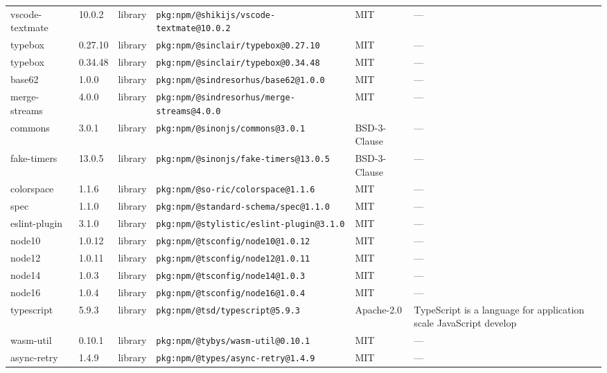 \documentclass[11pt,a4paper]{article}
\begin{document}
\begin{longtable}{|p{4cm}|p{2cm}|p{1.6cm}|p{5cm}|p{1.5cm}|p{3.5cm}|}
\raggedright vscode-textmate & 10.0.2 & library & \small\texttt{pkg:npm/@shikijs/vscode-textmate@10.0.2} & MIT & \small — \\
\raggedright typebox & 0.27.10 & library & \small\texttt{pkg:npm/@sinclair/typebox@0.27.10} & MIT & \small — \\
\raggedright typebox & 0.34.48 & library & \small\texttt{pkg:npm/@sinclair/typebox@0.34.48} & MIT & \small — \\
\raggedright base62 & 1.0.0 & library & \small\texttt{pkg:npm/@sindresorhus/base62@1.0.0} & MIT & \small — \\
\raggedright merge-streams & 4.0.0 & library & \small\texttt{pkg:npm/@sindresorhus/merge-streams@4.0.0} & MIT & \small — \\
\raggedright commons & 3.0.1 & library & \small\texttt{pkg:npm/@sinonjs/commons@3.0.1} & BSD-3-Clause & \small — \\
\raggedright fake-timers & 13.0.5 & library & \small\texttt{pkg:npm/@sinonjs/fake-timers@13.0.5} & BSD-3-Clause & \small — \\
\raggedright colorspace & 1.1.6 & library & \small\texttt{pkg:npm/@so-ric/colorspace@1.1.6} & MIT & \small — \\
\raggedright spec & 1.1.0 & library & \small\texttt{pkg:npm/@standard-schema/spec@1.1.0} & MIT & \small — \\
\raggedright eslint-plugin & 3.1.0 & library & \small\texttt{pkg:npm/@stylistic/eslint-plugin@3.1.0} & MIT & \small — \\
\raggedright node10 & 1.0.12 & library & \small\texttt{pkg:npm/@tsconfig/node10@1.0.12} & MIT & \small — \\
\raggedright node12 & 1.0.11 & library & \small\texttt{pkg:npm/@tsconfig/node12@1.0.11} & MIT & \small — \\
\raggedright node14 & 1.0.3 & library & \small\texttt{pkg:npm/@tsconfig/node14@1.0.3} & MIT & \small — \\
\raggedright node16 & 1.0.4 & library & \small\texttt{pkg:npm/@tsconfig/node16@1.0.4} & MIT & \small — \\
\raggedright typescript & 5.9.3 & library & \small\texttt{pkg:npm/@tsd/typescript@5.9.3} & Apache-2.0 & \small TypeScript is a language for application scale JavaScript develop \\
\raggedright wasm-util & 0.10.1 & library & \small\texttt{pkg:npm/@tybys/wasm-util@0.10.1} & MIT & \small — \\
\raggedright async-retry & 1.4.9 & library & \small\texttt{pkg:npm/@types/async-retry@1.4.9} & MIT & \small — \\

\end{longtable}
\end{document}
